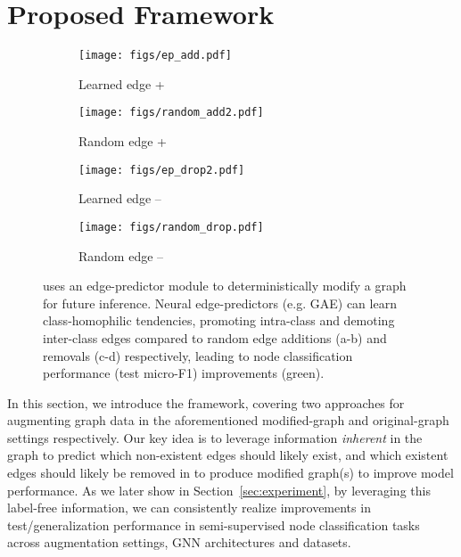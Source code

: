 \documentclass[letterpaper]{article} \usepackage{aaai21}  \usepackage{times}  \usepackage{helvet} \usepackage{courier}  \usepackage[hyphens]{url}  \usepackage{graphicx} \urlstyle{rm} \def\UrlFont{\rm}  \usepackage{natbib}  \usepackage{caption} \frenchspacing  \setlength{\pdfpagewidth}{8.5in}  \setlength{\pdfpageheight}{11in}
\begin{document}
\section{Proposed \methodshared Framework}
\label{sec:proposedmethod}
\begin{figure}[t]
    \centering
        \begin{subfigure}[b]{.43\linewidth}
          \texttt{[image: figs/ep\_add.pdf]}
          \caption{Learned edge +}\label{fig:}
        \end{subfigure}
\begin{subfigure}[b]{.43\linewidth}
          \texttt{[image: figs/random\_add2.pdf]}
             \caption{Random edge +}\label{fig:}
        \end{subfigure}
\begin{subfigure}[b]{.43\linewidth}
            \texttt{[image: figs/ep\_drop2.pdf]}
            \caption{Learned edge -- }\label{fig:}
        \end{subfigure}
\begin{subfigure}[b]{.43\linewidth}
            \texttt{[image: figs/random\_drop.pdf]}
            \caption{Random edge --}\label{fig:}
        \end{subfigure}
    \caption{\label{fig:2step} \methodtwo uses an edge-predictor module to deterministically modify a graph for future inference. Neural edge-predictors (e.g. GAE) can learn class-homophilic tendencies, promoting intra-class and demoting inter-class edges compared to random edge additions (a-b) and removals (c-d) respectively, leading to node classification performance (test micro-F1) improvements (green).}
\end{figure}



In this section, we introduce the \methodshared framework, covering two approaches for augmenting graph data in the aforementioned modified-graph and original-graph settings respectively.  Our key idea is to leverage information \emph{inherent} in the graph to predict which non-existent edges should likely exist, and which existent edges should likely be removed in  to produce modified graph(s)  to improve model performance.  As we later show in Section~\ref{sec:experiment}, by leveraging this label-free information, we can consistently realize improvements in test/generalization performance in semi-supervised node classification tasks across augmentation settings, GNN architectures and datasets.   
\end{document}
